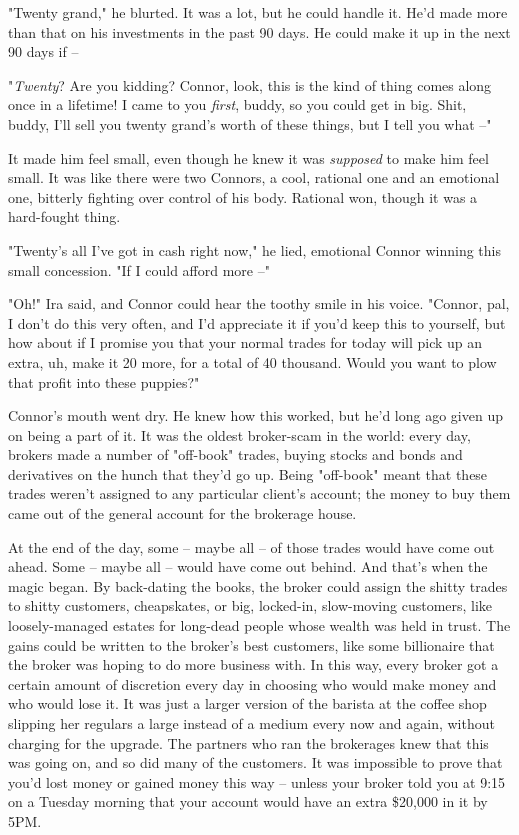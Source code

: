 "Twenty grand," he blurted. It was a lot, but he could handle it.
He'd made more than that on his investments in the past 90 days. He
could make it up in the next 90 days if --

"\emph{Twenty}? Are you kidding? Connor, look, this is the kind of
thing comes along once in a lifetime! I came to you \emph{first},
buddy, so you could get in big. Shit, buddy, I'll sell you twenty
grand's worth of these things, but I tell you what --"

It made him feel small, even though he knew it was \emph{supposed}
to make him feel small. It was like there were two Connors, a cool,
rational one and an emotional one, bitterly fighting over control
of his body. Rational won, though it was a hard-fought thing.

"Twenty's all I've got in cash right now," he lied, emotional
Connor winning this small concession. "If I could afford more --"

"Oh!" Ira said, and Connor could hear the toothy smile in his
voice. "Connor, pal, I don't do this very often, and I'd appreciate
it if you'd keep this to yourself, but how about if I promise you
that your normal trades for today will pick up an extra, uh, make
it 20 more, for a total of 40 thousand. Would you want to plow that
profit into these puppies?"

Connor's mouth went dry. He knew how this worked, but he'd long ago
given up on being a part of it. It was the oldest broker-scam in
the world: every day, brokers made a number of "off-book" trades,
buying stocks and bonds and derivatives on the hunch that they'd go
up. Being "off-book" meant that these trades weren't assigned to
any particular client's account; the money to buy them came out of
the general account for the brokerage house.

At the end of the day, some -- maybe all -- of those trades would
have come out ahead. Some -- maybe all -- would have come out
behind. And that's when the magic began. By back-dating the books,
the broker could assign the shitty trades to shitty customers,
cheapskates, or big, locked-in, slow-moving customers, like
loosely-managed estates for long-dead people whose wealth was held
in trust. The gains could be written to the broker's best
customers, like some billionaire that the broker was hoping to do
more business with. In this way, every broker got a certain amount
of discretion every day in choosing who would make money and who
would lose it. It was just a larger version of the barista at the
coffee shop slipping her regulars a large instead of a medium every
now and again, without charging for the upgrade. The partners who
ran the brokerages knew that this was going on, and so did many of
the customers. It was impossible to prove that you'd lost money or
gained money this way -- unless your broker told you at 9:15 on a
Tuesday morning that your account would have an extra \$20,000 in
it by 5PM.

